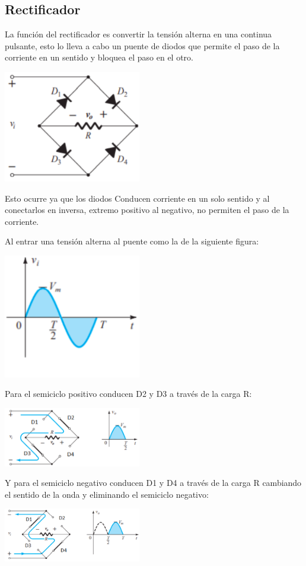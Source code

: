 \subsection{Rectificador}
\sangria{} La función del rectificador es convertir la tensión alterna en una continua pulsante, esto lo lleva a cabo un puente de diodos que permite el paso de la corriente en un sentido y bloquea el paso en el otro. 
\begin{center}
\includegraphics[width=6cm]{./imagenes/puent.png}
\end{center}
\sangria{} Esto ocurre ya que los diodos Conducen corriente en un solo sentido y al conectarlos en inversa, extremo positivo al negativo, no permiten el paso de la corriente.

\columnbreak

\sangria{} Al entrar una tensión alterna al puente como la de la siguiente figura: 
\begin{center}
    \includegraphics[width=6cm]{./imagenes/Alte.png}
\end{center}

\sangria{} Para el semiciclo positivo conducen D2 y D3 a través de la carga R:
\begin{center}
\includegraphics[width=6cm]{./imagenes/semic.png}
\end{center}
\sangria{} Y para el semiciclo negativo conducen D1 y D4 a través de la carga R cambiando el sentido de la onda y eliminando el semiciclo negativo:
\begin{center}
\includegraphics[width=6cm]{./imagenes/semisic2.png}
\end{center}

